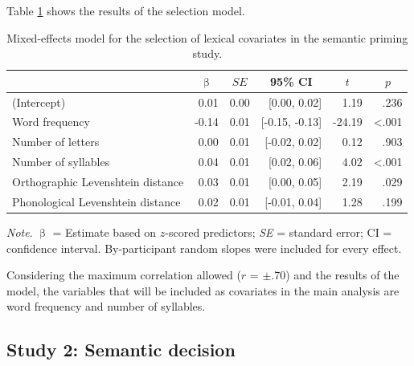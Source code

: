 \documentclass[
  12pt,
  man,floatsintext]{apa7}
\begin{document}
Table \ref{tab:semanticpriming-lexical-covariates-selection} shows the results of the selection model.

\begin{table}[!h]

\caption{\label{tab:semanticpriming-lexical-covariates-selection}Mixed-effects model for the selection of lexical covariates in the semantic priming study.}
\centering
\begin{threeparttable}
\begin{tabular}[t]{lrrrrr}
\toprule
\multicolumn{1}{c}{ } & \multicolumn{1}{c}{$\upbeta$} & \multicolumn{1}{c}{$SE$} & \multicolumn{1}{c}{95\% CI} & \multicolumn{1}{c}{$t$} & \multicolumn{1}{c}{$p$}\\
\midrule
(Intercept) & 0.01 & 0.00 & {}[0.00, 0.02] & 1.19 & .236\\
Word frequency & -0.14 & 0.01 & {}[-0.15, -0.13] & -24.19 & <.001\\
Number of letters & 0.00 & 0.01 & {}[-0.02, 0.02] & 0.12 & .903\\
Number of syllables & 0.04 & 0.01 & {}[0.02, 0.06] & 4.02 & <.001\\
Orthographic Levenshtein distance & 0.03 & 0.01 & {}[0.00, 0.05] & 2.19 & .029\\
Phonological Levenshtein distance & 0.02 & 0.01 & {}[-0.01, 0.04] & 1.28 & .199\\
\bottomrule
\end{tabular}
\begin{tablenotes}
\item \textit{\linebreak} 
\item \textit{Note}. $\upbeta$ = Estimate based on $z$-scored predictors; \textit{SE} = standard error; \linebreak \phantom{.}CI = confidence interval. By-participant random slopes were included for \linebreak \phantom{.}every effect.
\end{tablenotes}
\end{threeparttable}
\end{table}

Considering the maximum correlation allowed (\(r\) = \(\pm\).70) and the results of the model, the variables that will be included as covariates in the main analysis are word frequency and number of syllables.

\hypertarget{study-2-semantic-decision}{%
\subsection{Study 2: Semantic decision}\label{study-2-semantic-decision}}
\end{document}
